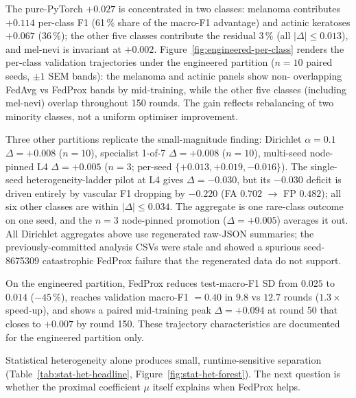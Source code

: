 \documentclass[11pt,a4paper]{report}
\begin{document}
The pure-PyTorch $+0.027$ is concentrated in two classes: melanoma
contributes $+0.114$ per-class F1 (61\,\% share of the macro-F1 advantage)
and actinic keratoses $+0.067$ (36\,\%); the other five classes contribute
the residual 3\,\% (all $|\Delta| \leq 0.013$), and mel-nevi is invariant at
$+0.002$. Figure~\ref{fig:engineered-per-class} renders the per-class
validation trajectories under the engineered partition ($n=10$ paired
seeds, $\pm 1$ SEM bands): the melanoma and actinic panels show non-
overlapping FedAvg vs FedProx bands by mid-training, while the other five
classes (including mel-nevi) overlap throughout 150 rounds. The gain
reflects rebalancing of two minority classes, not a uniform optimiser
improvement.

Three other partitions replicate the small-magnitude finding: Dirichlet
$\alpha = 0.1$ $\Delta = +0.008$ ($n=10$), specialist 1-of-7 $\Delta = +0.008$
($n=10$), multi-seed node-pinned L4 $\Delta = +0.005$ ($n=3$; per-seed
$\{+0.013, +0.019, -0.016\}$). The single-seed heterogeneity-ladder pilot
at L4 gives $\Delta = -0.030$, but its $-0.030$ deficit is driven entirely
by vascular F1 dropping by $-0.220$ (FA $0.702$ $\rightarrow$ FP $0.482$);
all six other classes are within $|\Delta| \leq 0.034$. The aggregate is one
rare-class outcome on one seed, and the $n=3$ node-pinned promotion
($\Delta = +0.005$) averages it out. All Dirichlet aggregates above use
regenerated raw-JSON summaries; the previously-committed analysis CSVs were
stale and showed a spurious seed-8675309 catastrophic FedProx failure that
the regenerated data do not support.

On the engineered partition, FedProx reduces test-macro-F1 SD from $0.025$
to $0.014$ ($-45\,\%$), reaches validation macro-F1 $= 0.40$ in $9.8$ vs
$12.7$ rounds ($1.3\times$ speed-up), and shows a paired mid-training peak
$\Delta = +0.094$ at round 50 that closes to $+0.007$ by round 150. These
trajectory characteristics are documented for the engineered partition only.

Statistical heterogeneity alone produces small, runtime-sensitive separation
(Table~\ref{tab:stat-het-headline}, Figure~\ref{fig:stat-het-forest}). The
next question is whether the proximal coefficient $\mu$ itself explains when
FedProx helps.


\end{document}
